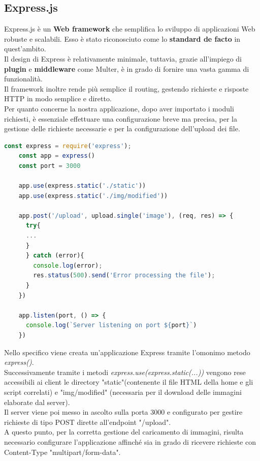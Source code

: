 \subsection{Express.js}
Express.js è un \textbf{Web framework} che semplifica lo sviluppo di applicazioni Web robuste e scalabili. Esso è stato riconosciuto come lo \textbf{standard de facto} in quest'ambito.
\\Il design di Express è relativamente minimale, tuttavia, grazie all'impiego di \textbf{plugin} e \textbf{middleware} come Multer, è in grado di fornire una vasta gamma di funzionalità.
\\Il framework inoltre rende più semplice il routing, gestendo richieste e risposte HTTP in modo semplice e diretto.
\\Per quanto concerne la nostra applicazione, dopo aver importato i moduli richiesti, è essenziale effettuare una configurazione breve ma precisa, per la gestione delle richieste necessarie e per la configurazione dell'upload dei file.
\begin{lstlisting}[language=JavaScript, caption={Configurazione Express.js}, showstringspaces=false]
    const express = require('express');
    const app = express()
    const port = 3000
        
    app.use(express.static('./static'))
    app.use(express.static('./img/modified'))
    
    app.post('/upload', upload.single('image'), (req, res) => {
      try{
      ...
      }
      } catch (error){
        console.log(error);
        res.status(500).send('Error processing the file');
      }
    })
    
    app.listen(port, () => {
      console.log(`Server listening on port ${port}`)
    })
\end{lstlisting}
Nello specifico viene creata un'applicazione Express tramite l'omonimo metodo \emph{express()}.
\\Successivamente tramite i metodi \emph{express.use(express.static(...))} vengono rese accessibili ai client le directory "static"(contenente il file HTML della home e gli script correlati) e "img/modified" (necessaria per il download delle immagini elaborate dal server).
\\Il server viene poi messo in ascolto sulla porta 3000 e configurato per gestire richieste di tipo POST dirette all'endpoint "/upload".
\\A questo punto, per la corretta gestione del caricamento di immagini, risulta necessario configurare l'applicazione affinché sia in grado di ricevere richieste con Content-Type "multipart/form-data".
